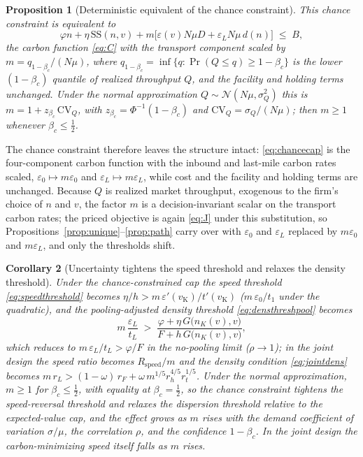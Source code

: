 \documentclass[11pt]{article}
\newtheorem{proposition}{Proposition}
\newtheorem{corollary}[proposition]{Corollary}
\theoremstyle{definition}
\theoremstyle{remark}
\theoremstyle{plain}
\newcommand{\sstock}{\mathrm{SS}}
\begin{document}
\begin{proposition}[Deterministic equivalent of the chance constraint]\label{prop:chance}
This chance constraint is equivalent to
\begin{equation}\label{eq:chancecap}
  \varphi n + \eta\,\sstock(n,v) + m\big[\varepsilon(v)N\mu D+\varepsilon_L N\mu\, d(n)\big]\;\le\;B,
\end{equation}
the carbon function \eqref{eq:C} with the transport component scaled by $m=q_{1-\beta_c}/(N\mu)$, where
$q_{1-\beta_c}=\inf\{q:\Pr(Q\le q)\ge1-\beta_c\}$ is the lower $(1-\beta_c)$ quantile of realized throughput $Q$, and the facility and holding terms
unchanged. Under the normal approximation $Q\sim\mathcal N(N\mu,\sigma_Q^2)$ this is
$m=1+z_{\beta_c}\,\mathrm{CV}_Q$, with $z_{\beta_c}=\Phi^{-1}(1-\beta_c)$ and $\mathrm{CV}_Q=\sigma_Q/(N\mu)$; then
$m\ge 1$ whenever $\beta_c\le\tfrac12$.
\end{proposition}

\noindent The chance constraint therefore leaves the structure intact: \eqref{eq:chancecap} is the
four-component carbon function with the inbound and last-mile carbon rates scaled, $\varepsilon_0\mapsto
m\varepsilon_0$ and $\varepsilon_L\mapsto m\varepsilon_L$, while cost and the facility and holding terms are
unchanged. Because $Q$ is realized market throughput, exogenous to the firm's choice of $n$ and $v$, the
factor $m$ is a decision-invariant scalar on the transport carbon rates; the priced objective is again
\eqref{eq:J} under this substitution, so Propositions~\ref{prop:unique}--\ref{prop:path} carry over with
$\varepsilon_0$ and $\varepsilon_L$ replaced by $m\varepsilon_0$ and $m\varepsilon_L$, and only the thresholds
shift.

\begin{corollary}[Uncertainty tightens the speed threshold and relaxes the density threshold]\label{cor:chance}
Under the chance-constrained cap the speed threshold \eqref{eq:speedthreshold} becomes
$\eta/h>m\,\varepsilon'(v_{\mathrm K})/t'(v_{\mathrm K})$ ($m\,\varepsilon_0/t_1$ under the quadratic), and the
pooling-adjusted density threshold \eqref{eq:densthreshpool} becomes
\begin{equation}\label{eq:chancedensthresh}
  m\,\frac{\varepsilon_L}{t_L} \;>\; \frac{\varphi+\eta\,G\big(n_K(v),v\big)}{F+h\,G\big(n_K(v),v\big)},
\end{equation}
which reduces to $m\,\varepsilon_L/t_L>\varphi/F$ in the no-pooling limit ($\rho\to1$); in the joint design
the speed ratio becomes $R_{\mathrm{speed}}/m$ and the density condition \eqref{eq:jointdens} becomes
$m\,r_L>(1-\omega)\,r_F+\omega\,m^{1/5}r_h^{4/5}r_t^{1/5}$. Under the normal approximation, $m\ge 1$ for
$\beta_c\le\tfrac12$, with equality at $\beta_c=\tfrac12$, so the chance constraint tightens the speed-reversal
threshold and relaxes the dispersion threshold relative to the expected-value cap, and the effect grows as $m$ rises with the demand
coefficient of variation $\sigma/\mu$, the correlation $\rho$, and the confidence $1-\beta_c$. In the joint design
the carbon-minimizing speed itself falls as $m$ rises.
\end{corollary}
\end{document}
